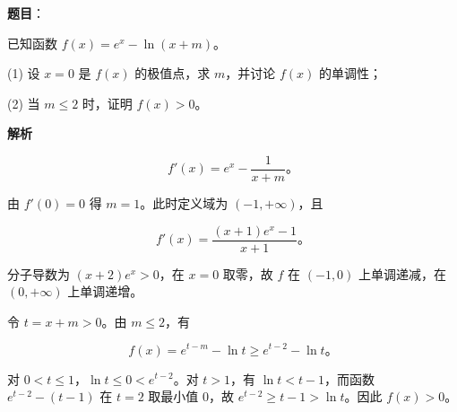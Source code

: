 \begin{answer}

\textbf{题目}：

已知函数 $f(x)=e^x-\ln(x+m)$。

(1) 设 $x=0$ 是 $f(x)$ 的极值点，求 $m$，并讨论 $f(x)$ 的单调性；

(2) 当 $m\leqslant2$ 时，证明 $f(x)>0$。

\textbf{解析}


\nopagebreak[4]
\[f'(x)=e^x-\frac1{x+m}\text{。}\]

由 $f'(0)=0$ 得 $m=1$。此时定义域为 $(-1,+\infty)$，且

\nopagebreak[4]
\[f'(x)=\frac{(x+1)e^x-1}{x+1}\text{。}\]

分子导数为 $(x+2)e^x>0$，在 $x=0$ 取零，故 $f$ 在 $(-1,0)$ 上单调递减，在 $(0,+\infty)$ 上单调递增。


令 $t=x+m>0$。由 $m\leqslant2$，有

\nopagebreak[4]
\[f(x)=e^{t-m}-\ln t\geqslant e^{t-2}-\ln t\text{。}\]

对 $0<t\leqslant1$，$\ln t\leqslant0<e^{t-2}$。对 $t>1$，有 $\ln t<t-1$，而函数 $e^{t-2}-(t-1)$ 在 $t=2$ 取最小值 $0$，故 $e^{t-2}\geqslant t-1>\ln t$。因此 $f(x)>0$。



\end{answer}
